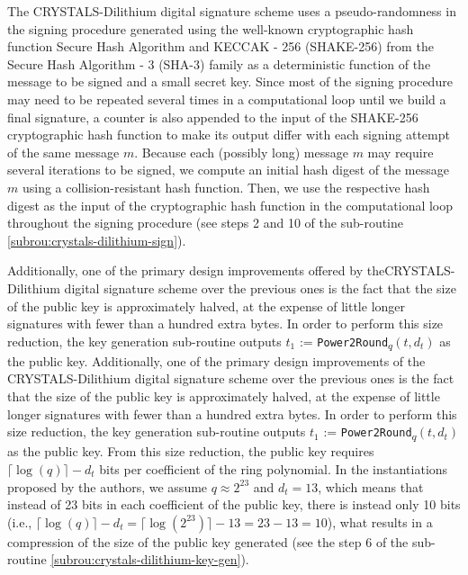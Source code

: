 \documentclass[runningheads]{llncs}
\numberwithin{equation}{section}
\begin{document}
    The CRYSTALS-Dilithium digital signature scheme uses a pseudo-randomness in the signing procedure generated using the well-known cryptographic hash function Secure Hash Algorithm and KECCAK - 256 (SHAKE-256) from the Secure Hash Algorithm - 3 (SHA-3) family as a deterministic function of the message to be signed and a small secret key. Since most of the signing procedure may need to be repeated several times in a computational loop until we build a final signature, a counter is also appended to the input of the SHAKE-256 cryptographic hash function to make its output differ with each signing attempt of the same message $m$. Because each (possibly long) message $m$ may require several iterations to be signed, we compute an initial hash digest of the message $m$ using a collision-resistant hash function. Then, we use the respective hash digest as the input of the cryptographic hash function in the computational loop throughout the signing procedure (see steps 2 and 10 of the sub-routine \ref{subrou:crystals-dilithium-sign}).

    Additionally, one of the primary design improvements offered by the\break CRYSTALS-Dilithium digital signature scheme over the previous ones is the fact that the size of the public key is approximately halved, at the expense of little longer signatures with fewer than a hundred extra bytes. In order to perform this size reduction, the key generation sub-routine outputs ${t}_{1}$ := \texttt{Power2Round}\textsubscript{$q$}$\left( t, {d}_{t} \right)$ as the public key. Additionally, one of the primary design improvements of the CRYSTALS-Dilithium digital signature scheme over the previous ones is the fact that the size of the public key is approximately halved, at the expense of little longer signatures with fewer than a hundred extra bytes. In order to perform this size reduction, the key generation sub-routine outputs ${t}_{1}$ := \texttt{Power2Round}\textsubscript{$q$}$\left( t, {d}_{t} \right)$ as the public key. From this size reduction, the public key requires $\lceil \log{(q)} \rceil - {d}_{t}$ bits per coefficient of the ring polynomial. In the instantiations proposed by the authors, we assume $q \approx {2}^{23}$ and ${d}_{t} = 13$, which means that instead of 23 bits in each coefficient of the public key, there is instead only 10 bits (i.e., $\lceil \log{(q)} \rceil - {d}_{t} = \lceil \log{ ({2}^{23}) } \rceil - 13 = 23 - 13 = 10$), what results in a compression of the size of the public key generated (see the step 6 of the sub-routine \ref{subrou:crystals-dilithium-key-gen}).
\end{document}

